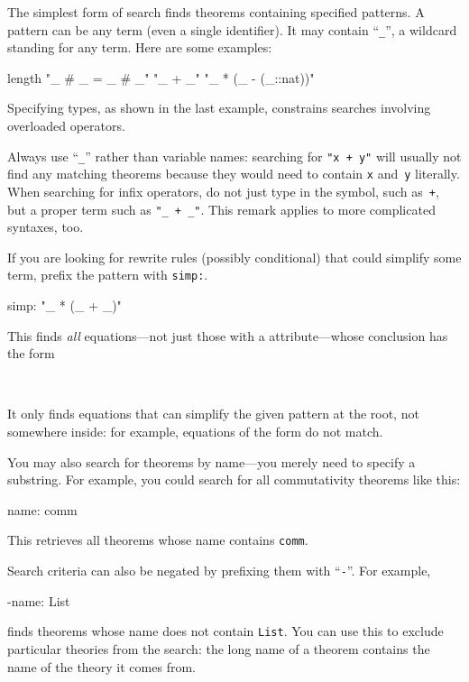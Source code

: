 \begin{isabellebody}
\begin{isamarkuptext}
The simplest form of search finds theorems containing specified
patterns.  A pattern can be any term (even
a single identifier).  It may contain ``\texttt{\_}'', a wildcard standing
for any term. Here are some
examples:
\begin{ttbox}
length
"_ # _ = _ # _"
"_ + _"
"_ * (_ - (_::nat))"
\end{ttbox}
Specifying types, as shown in the last example, 
constrains searches involving overloaded operators.

\begin{warn}
Always use ``\texttt{\_}'' rather than variable names: searching for
\texttt{"x + y"} will usually not find any matching theorems
because they would need to contain \texttt{x} and~\texttt{y} literally.
When searching for infix operators, do not just type in the symbol,
such as~\texttt{+}, but a proper term such as \texttt{"_ + _"}.
This remark applies to more complicated syntaxes, too.
\end{warn}

If you are looking for rewrite rules (possibly conditional) that could
simplify some term, prefix the pattern with \texttt{simp:}.
\begin{ttbox}
simp: "_ * (_ + _)"
\end{ttbox}
This finds \emph{all} equations---not just those with a  attribute---whose conclusion has the form
\begin{isabelle}%
\ \ \ \ \ {\isacharunderscore}\ {\isacharasterisk}\ {\isacharparenleft}{\isacharunderscore}\ {\isacharplus}\ {\isacharunderscore}{\isacharparenright}\ {\isacharequal}\ {\isasymdots}%
\end{isabelle}
It only finds equations that can simplify the given pattern
at the root, not somewhere inside: for example, equations of the form
\isa{{\isacharunderscore}\ {\isacharplus}\ {\isacharunderscore}\ {\isacharequal}\ {\isasymdots}} do not match.

You may also search for theorems by name---you merely
need to specify a substring. For example, you could search for all
commutativity theorems like this:
\begin{ttbox}
name: comm
\end{ttbox}
This retrieves all theorems whose name contains \texttt{comm}.

Search criteria can also be negated by prefixing them with ``\texttt{-}''.
For example,
\begin{ttbox}
-name: List
\end{ttbox}
finds theorems whose name does not contain \texttt{List}. You can use this
to exclude particular theories from the search: the long name of
a theorem contains the name of the theory it comes from.


\end{isamarkuptext}
\end{isabellebody}
